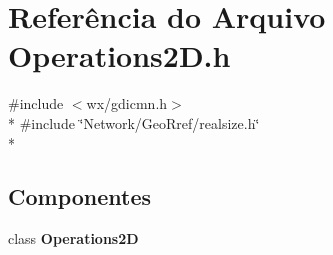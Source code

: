 \section{Referência do Arquivo Operations2\+D.\+h}
\label{_operations2_d_8h}
{\ttfamily \#include $<$wx/gdicmn.\+h$>$}\\*
{\ttfamily \#include \char`\"{}Network/\+Geo\+Rref/realsize.\+h\char`\"{}}\\*
\subsection*{Componentes}
\begin{DoxyCompactItemize}
\item 
class {\bf Operations2D}
\end{DoxyCompactItemize}

